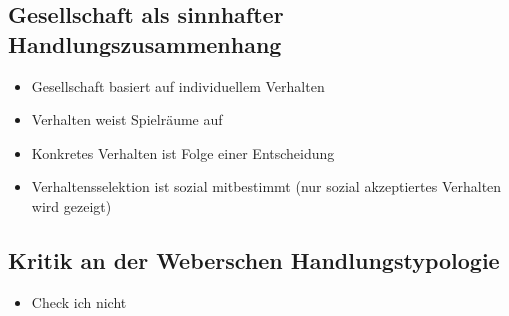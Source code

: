 \documentclass{scrartcl}
\begin{document}
\subsection*{Gesellschaft als sinnhafter Handlungszusammenhang}
\begin{itemize}
    \item
        Gesellschaft basiert auf individuellem Verhalten
    \item
        Verhalten weist Spielräume auf
    \item
        Konkretes Verhalten ist Folge einer Entscheidung
    \item
        Verhaltensselektion ist sozial mitbestimmt (nur sozial akzeptiertes Verhalten wird gezeigt)
\end{itemize}

\subsection*{Kritik an der Weberschen Handlungstypologie}
\begin{itemize}
    \item
        Check ich nicht
\end{itemize}
\end{document}
